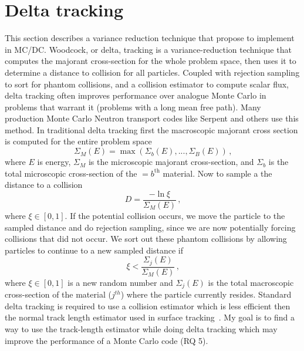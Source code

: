%

\section{Delta tracking}

This section describes a variance reduction technique that propose to implement in MC/DC.
Woodcock, or delta, tracking \cite{woodcock_techniques_1965} is a variance-reduction technique that computes the majorant cross-section for the whole problem space, then uses it to determine a distance to collision for all particles.
Coupled with rejection sampling to sort for phantom collisions, and a collision estimator to compute scalar flux, delta tracking often improves performance over analogue Monte Carlo in problems that warrant it (problems with a long mean free path).
Many production Monte Carlo Neutron transport codes like Serpent \cite{leppanen_development_2013, leppanen_use_2017, leppanen_2010_burnup} and others \cite{delta2017rowland} use this method.
In traditional delta tracking first the macroscopic majorant cross section is computed for the entire problem space
\begin{equation}
    \label{eq:majorant}
    \Sigma_{M}(E) = \max\left(\Sigma_{b}(E), ..., \Sigma_{B}(E)\right) \,\text{,}
\end{equation}
where $E$ is energy, $\Sigma_{M}$ is the microscopic majorant cross-section, and $\Sigma_{b}$ is the total microscopic cross-section of the $=b^{\text{th}}$ material.
Now to sample a the distance to a collision
\begin{equation}
    \label{eq:sample}
    D = \frac{-\ln{\xi}}{\Sigma_{M}(E)} \, \text{,} 
\end{equation}
where $\xi\in[0,1]$.
If the potential collision occurs, we move the particle to the sampled distance and do rejection sampling, since we are now potentially forcing collisions that did not occur.
We sort out these phantom collisions by allowing particles to continue to a new sampled distance if
\begin{equation}
    \label{eq:reject}
    \xi < \frac{ \Sigma_{j}(E) } { \Sigma_M(E) } \, \text{,}
\end{equation}
where $\xi\in[0,1]$ is a new random number and $\Sigma_{j}(E)$ is the total macroscopic cross-section of the material ($j^{th}$) where the particle currently resides.
Standard delta tracking is required to use a collision estimator which is less efficient then the normal track length estimator used in surface tracking~\cite{mc2018}.
My goal is to find a way to use the track-length estimator while doing delta tracking which may improve the performance of a Monte Carlo code (RQ 5).



